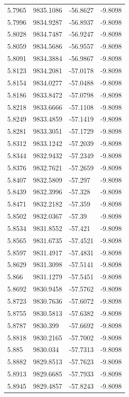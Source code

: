 \begin{table}[H]
\begin{tabular}{llll}
5.7965 & 9835.1086 & -56.8627 & -9.8098 \\
5.7996 & 9834.9287 & -56.8937 & -9.8098 \\
5.8028 & 9834.7487 & -56.9247 & -9.8098 \\
5.8059 & 9834.5686 & -56.9557 & -9.8098 \\
5.8091 & 9834.3884 & -56.9867 & -9.8098 \\
5.8123 & 9834.2081 & -57.0178 & -9.8098 \\
5.8154 & 9834.0277 & -57.0488 & -9.8098 \\
5.8186 & 9833.8472 & -57.0798 & -9.8098 \\
5.8218 & 9833.6666 & -57.1108 & -9.8098 \\
5.8249 & 9833.4859 & -57.1419 & -9.8098 \\
5.8281 & 9833.3051 & -57.1729 & -9.8098 \\
5.8312 & 9833.1242 & -57.2039 & -9.8098 \\
5.8344 & 9832.9432 & -57.2349 & -9.8098 \\
5.8376 & 9832.7621 & -57.2659 & -9.8098 \\
5.8407 & 9832.5809 & -57.297 & -9.8098 \\
5.8439 & 9832.3996 & -57.328 & -9.8098 \\
5.8471 & 9832.2182 & -57.359 & -9.8098 \\
5.8502 & 9832.0367 & -57.39 & -9.8098 \\
5.8534 & 9831.8552 & -57.421 & -9.8098 \\
5.8565 & 9831.6735 & -57.4521 & -9.8098 \\
5.8597 & 9831.4917 & -57.4831 & -9.8098 \\
5.8629 & 9831.3098 & -57.5141 & -9.8098 \\
5.866 & 9831.1279 & -57.5451 & -9.8098 \\
5.8692 & 9830.9458 & -57.5762 & -9.8098 \\
5.8723 & 9830.7636 & -57.6072 & -9.8098 \\
5.8755 & 9830.5813 & -57.6382 & -9.8098 \\
5.8787 & 9830.399 & -57.6692 & -9.8098 \\
5.8818 & 9830.2165 & -57.7002 & -9.8098 \\
5.885 & 9830.034 & -57.7313 & -9.8098 \\
5.8882 & 9829.8513 & -57.7623 & -9.8098 \\
5.8913 & 9829.6685 & -57.7933 & -9.8098 \\
5.8945 & 9829.4857 & -57.8243 & -9.8098 \\

\end{tabular}
\end{table}
